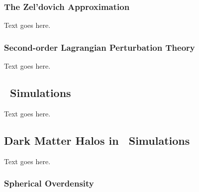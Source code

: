 \subsubsection{The Zel'dovich Approximation}
\label{subsubsec:computational_theory--simulation_initialization--za_theory}


Text goes here.



\subsubsection{Second-order Lagrangian Perturbation Theory}
\label{subsubsec:computational_theory--simulation_initialization--2lpt_theory}


Text goes here.




\subsection{\nbody\ Simulations}
\label{subsec:computational_theory--nbody_simulations}


Text goes here.




\subsection{Dark Matter Halos in \nbody\ Simulations}
\label{subsec:computational_theory--halos_in_nbody_simulations}


Text goes here.



\subsubsection{Spherical Overdensity}
\label{subsubsec:computational_theory--halos_in_nbody_simulations--spherical_overdensity}


